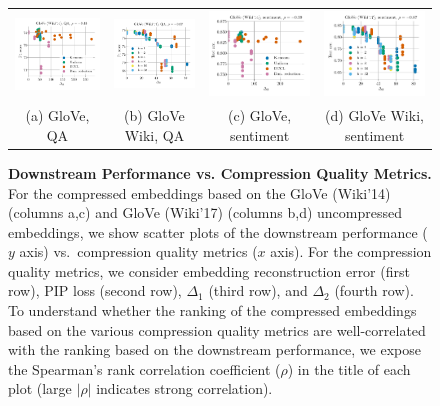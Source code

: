 \begin{figure}
\begin{tabular}{@{\hskip -0.0in}c@{\hskip -0.0in}c@{\hskip -0.0in}c@{\hskip -0.0in}c@{\hskip -0.0in}}
		\includegraphics[width=.245\linewidth]{figures/glove400k_qa_best-f1_vs_gram-large-dim-delta2-2_linx.pdf} &
		\includegraphics[width=.245\linewidth]{figures/glove-wiki400k-am_qa_best-f1_vs_gram-large-dim-delta2-2_linx.pdf} &
		\includegraphics[width=.245\linewidth]{figures/glove400k_sentiment_sst_test-acc_vs_gram-large-dim-delta2-2_linx.pdf} &
		\includegraphics[width=.245\linewidth]{figures/glove-wiki400k-am_sentiment_sst_test-acc_vs_gram-large-dim-delta2-2_linx.pdf} \\
		(a) GloVe, QA & (b) GloVe Wiki, QA  & (c) GloVe, sentiment & (d) GloVe Wiki, sentiment
	\end{tabular}
	\caption{
		\textbf{Downstream Performance vs. Compression Quality Metrics.}
		For the compressed embeddings based on the GloVe (Wiki'14) (columns a,c) and GloVe (Wiki'17) (columns b,d) uncompressed embeddings, we show scatter plots of the downstream performance ($y$ axis) vs.\ compression quality metrics ($x$ axis).
		For the compression quality metrics, we consider embedding reconstruction error (first row), PIP loss (second row), $\Delta_1$ (third row), and $\Delta_2$ (fourth row).
		To understand whether the ranking of the compressed embeddings based on the various compression quality metrics are well-correlated with the ranking based on the downstream performance, we expose the Spearman's rank correlation coefficient ($\rho$) in the title of each plot (large $|\rho|$ indicates strong correlation).
}
\end{figure}
